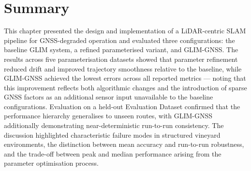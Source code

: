 \section{Summary}
\label{sec:slam-summary}

This chapter presented the design and implementation of a LiDAR-centric SLAM pipeline for GNSS-degraded operation and evaluated three configurations: the baseline GLIM system, a refined parameterised variant, and GLIM-GNSS. The results across five parameterisation datasets showed that parameter refinement reduced drift and improved trajectory smoothness relative to the baseline, while GLIM-GNSS achieved the lowest errors across all reported metrics --- noting that this improvement reflects both algorithmic changes and the introduction of sparse GNSS factors as an additional sensor input unavailable to the baseline configurations. Evaluation on a held-out Evaluation Dataset confirmed that the performance hierarchy generalises to unseen routes, with GLIM-GNSS additionally demonstrating near-deterministic run-to-run consistency. The discussion highlighted characteristic failure modes in structured vineyard environments, the distinction between mean accuracy and run-to-run robustness, and the trade-off between peak and median performance arising from the parameter optimisation process.